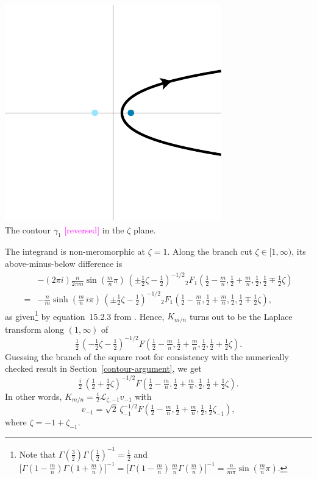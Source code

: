 \documentclass{article}
\newcommand{\laplace}{\mathcal{L}}
\begin{document}
\begin{center}
\includegraphics{figures/zeta_contour_3.pdf} \\[1em]
{\small The contour $\gamma_1$ \textcolor{magenta}{[reversed]} in the $\zeta$ plane.}
\end{center}

The integrand is non-meromorphic at $\zeta = 1$. Along the branch cut $\zeta \in [1, \infty)$, its above-minus-below difference is
\begin{align*}
& -(2\pi i)\tfrac{n}{2\pi m} \sin(\tfrac{m}{n} \pi)\,(\pm\tfrac{1}{2}\zeta - \tfrac{1}{2})^{-1/2} {}_2F_1(\tfrac{1}{2} - \tfrac{m}{n}, \tfrac{1}{2} + \tfrac{m}{n}, \tfrac{1}{2}, \tfrac{1}{2} \mp \tfrac{1}{2}\zeta) \\
= & -\tfrac{n}{m} \sinh(\tfrac{m}{n}\,i\pi)\,(\pm\tfrac{1}{2}\zeta - \tfrac{1}{2})^{-1/2} {}_2F_1(\tfrac{1}{2} - \tfrac{m}{n}, \tfrac{1}{2} + \tfrac{m}{n}, \tfrac{1}{2}, \tfrac{1}{2} \mp \tfrac{1}{2}\zeta),
\end{align*}
as given\footnote{Note that $\Gamma(\tfrac{3}{2}) \Gamma(\tfrac{1}{2})^{-1} = \tfrac{1}{2}$ and $\big[\Gamma(1 - \tfrac{m}{n})\Gamma(1 + \tfrac{m}{n})\big]^{-1} = \big[\Gamma(1 - \tfrac{m}{n})\,\tfrac{m}{n}\Gamma(\tfrac{m}{n})\big]^{-1} = \tfrac{n}{m\pi} \sin(\tfrac{m}{n} \pi)$.} by equation~15.2.3 from \cite{dlmf}. Hence, $K_{m/n}$ turns out to be the Laplace transform along $(1, \infty)$ of
\[ \tfrac{1}{2}\,(-\tfrac{1}{2}\zeta - \tfrac{1}{2})^{-1/2} F(\tfrac{1}{2} - \tfrac{m}{n}, \tfrac{1}{2} + \tfrac{m}{n}, \tfrac{1}{2}, \tfrac{1}{2} + \tfrac{1}{2}\zeta). \]
\color{DarkCyan}
Guessing the branch of the square root for consistency with the numerically checked result in Section~\ref{contour-argument}, we get
\[ \tfrac{i}{2}\,(\tfrac{1}{2} + \tfrac{1}{2}\zeta)^{-1/2} F(\tfrac{1}{2} - \tfrac{m}{n}, \tfrac{1}{2} + \tfrac{m}{n}, \tfrac{1}{2}, \tfrac{1}{2} + \tfrac{1}{2}\zeta). \]
In other words, $K_{m/n} = \tfrac{i}{2} \laplace_{\zeta, -1} v_{-1}$ with
\[ v_{-1} = \sqrt{2}\,\zeta_{-1}^{-1/2} F(\tfrac{1}{2} - \tfrac{m}{n}, \tfrac{1}{2} + \tfrac{m}{n}, \tfrac{1}{2}, \tfrac{1}{2}\zeta_{-1}), \]
where $\zeta = -1 + \zeta_{-1}$.
\color{black}
\end{document}
